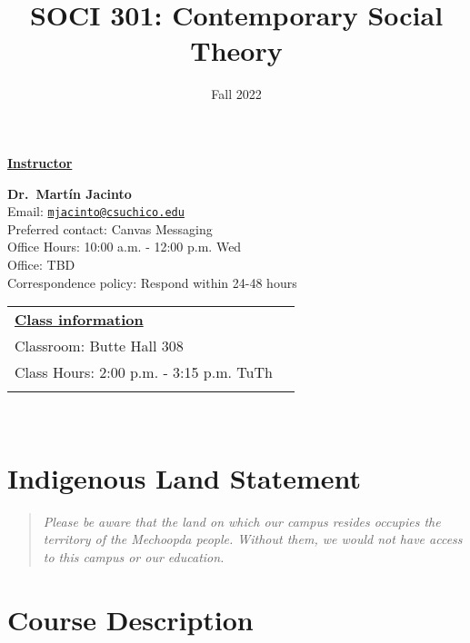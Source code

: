 \documentclass[11pt,]{article}
\title{SOCI 301: Contemporary Social Theory}
\date{Fall 2022}
\begin{document}
  

		\maketitle
		
	
		\thispagestyle{firststyle}

\textbf{\underline{Instructor}}
\begin{multicols}{2}

  \textbf{Dr.~Martín Jacinto}\\
  Email: \href{mailto:mjacinto@csuchico.edu}{\nolinkurl{mjacinto@csuchico.edu}}\\
  Preferred contact: Canvas Messaging\\
  Office Hours: 10:00 a.m. - 12:00 p.m. Wed\\
  Office: TBD\\
  Correspondence policy: Respond within 24-48 hours\\
    \columnbreak
    
  \end{multicols}
	
\noindent \begin{tabular*}{\textwidth}{ @{\extracolsep{\fill}} lr @{\extracolsep{\fill}}}
\textbf{\underline{Class information}}\\
  Classroom: Butte Hall 308\\
  Class Hours: 2:00 p.m. - 3:15 p.m. TuTh\\
    \\
	\end{tabular*}\\


\vspace{2mm}


\hypertarget{indigenous-land-statement}{%
\section{Indigenous Land Statement}\label{indigenous-land-statement}}

\begin{quote}
\emph{Please be aware that the land on which our campus resides occupies
the territory of the Mechoopda people. Without them, we would not have
access to this campus or our education.}
\end{quote}

\hypertarget{course-description}{%
\section{Course Description}\label{course-description}}
\end{document}

